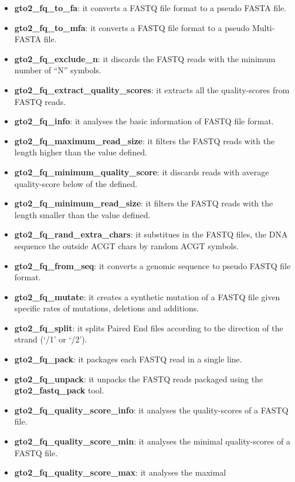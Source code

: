 \documentclass[11pt,]{krantz}
\providecommand{\tightlist}{%
  \setlength{\itemsep}{0pt}\setlength{\parskip}{0pt}}
\begin{document}
\begin{itemize}
\tightlist
\item
  \textbf{gto2\_fq\_to\_fa}: it converts a FASTQ file format to a pseudo
  FASTA file.
\item
  \textbf{gto2\_fq\_to\_mfa}: it converts a FASTQ file format to a
  pseudo Multi-FASTA file.
\item
  \textbf{gto2\_fq\_exclude\_n}: it discards the FASTQ reads with the
  minimum number of ``N'' symbols.
\item
  \textbf{gto2\_fq\_extract\_quality\_scores}: it extracts all the
  quality-scores from FASTQ reads.
\item
  \textbf{gto2\_fq\_info}: it analyses the basic information of FASTQ
  file format.
\item
  \textbf{gto2\_fq\_maximum\_read\_size}: it filters the FASTQ reads
  with the length higher than the value defined.
\item
  \textbf{gto2\_fq\_minimum\_quality\_score}: it discards reads with
  average quality-score below of the defined.
\item
  \textbf{gto2\_fq\_minimum\_read\_size}: it filters the FASTQ reads
  with the length smaller than the value defined.
\item
  \textbf{gto2\_fq\_rand\_extra\_chars}: it substitues in the FASTQ
  files, the DNA sequence the outside ACGT chars by random ACGT symbols.
\item
  \textbf{gto2\_fq\_from\_seq}: it converts a genomic sequence to pseudo
  FASTQ file format.
\item
  \textbf{gto2\_fq\_mutate}: it creates a synthetic mutation of a FASTQ
  file given specific rates of mutations, deletions and additions.
\item
  \textbf{gto2\_fq\_split}: it splits Paired End files according to the
  direction of the strand (`/1' or `/2').
\item
  \textbf{gto2\_fq\_pack}: it packages each FASTQ read in a single line.
\item
  \textbf{gto2\_fq\_unpack}: it unpacks the FASTQ reads packaged using
  the \textbf{gto2\_fastq\_pack} tool.
\item
  \textbf{gto2\_fq\_quality\_score\_info}: it analyses the
  quality-scores of a FASTQ file.
\item
  \textbf{gto2\_fq\_quality\_score\_min}: it analyses the minimal
  quality-scores of a FASTQ file.
\item
  \textbf{gto2\_fq\_quality\_score\_max}: it analyses the maximal

\end{itemize}
\end{document}
